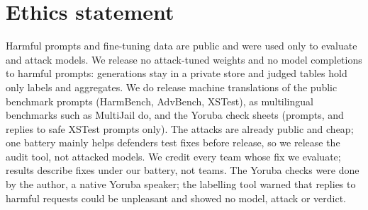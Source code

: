 \section*{Ethics statement}
Harmful prompts and fine-tuning data are public and were used only to evaluate and attack models. We
release no attack-tuned weights and no model completions to harmful prompts: generations stay in a private store
and judged tables hold only labels and aggregates. We do release machine translations of the
public benchmark prompts (HarmBench, AdvBench, XSTest), as multilingual benchmarks such as MultiJail
\citep{deng2024multilingual} do, and the Yoruba check sheets (prompts, and replies to safe XSTest prompts only). The attacks are
already public and cheap; one battery mainly helps defenders test fixes before release, so we release the audit
tool, not attacked models. We credit every team whose fix we evaluate; results describe fixes under our battery, not teams. The Yoruba checks were done by the author, a native Yoruba
speaker; the labelling tool warned that replies to harmful requests could be unpleasant and showed no
model, attack or verdict.
